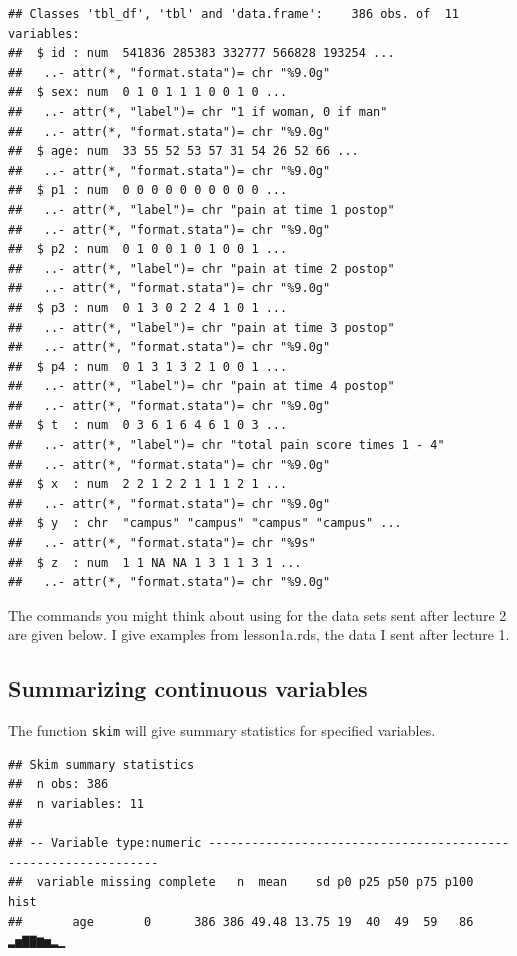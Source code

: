 \documentclass[]{book}
\newenvironment{Shaded}{\begin{snugshade}}{\end{snugshade}}
\newcommand{\KeywordTok}[1]{\textcolor[rgb]{0.13,0.29,0.53}{\textbf{#1}}}
\newcommand{\NormalTok}[1]{#1}
\newcommand{\OperatorTok}[1]{\textcolor[rgb]{0.81,0.36,0.00}{\textbf{#1}}}
\newcommand{\StringTok}[1]{\textcolor[rgb]{0.31,0.60,0.02}{#1}}
\begin{document}
\begin{verbatim}
## Classes 'tbl_df', 'tbl' and 'data.frame':    386 obs. of  11 variables:
##  $ id : num  541836 285383 332777 566828 193254 ...
##   ..- attr(*, "format.stata")= chr "%9.0g"
##  $ sex: num  0 1 0 1 1 1 0 0 1 0 ...
##   ..- attr(*, "label")= chr "1 if woman, 0 if man"
##   ..- attr(*, "format.stata")= chr "%9.0g"
##  $ age: num  33 55 52 53 57 31 54 26 52 66 ...
##   ..- attr(*, "format.stata")= chr "%9.0g"
##  $ p1 : num  0 0 0 0 0 0 0 0 0 0 ...
##   ..- attr(*, "label")= chr "pain at time 1 postop"
##   ..- attr(*, "format.stata")= chr "%9.0g"
##  $ p2 : num  0 1 0 0 1 0 1 0 0 1 ...
##   ..- attr(*, "label")= chr "pain at time 2 postop"
##   ..- attr(*, "format.stata")= chr "%9.0g"
##  $ p3 : num  0 1 3 0 2 2 4 1 0 1 ...
##   ..- attr(*, "label")= chr "pain at time 3 postop"
##   ..- attr(*, "format.stata")= chr "%9.0g"
##  $ p4 : num  0 1 3 1 3 2 1 0 0 1 ...
##   ..- attr(*, "label")= chr "pain at time 4 postop"
##   ..- attr(*, "format.stata")= chr "%9.0g"
##  $ t  : num  0 3 6 1 6 4 6 1 0 3 ...
##   ..- attr(*, "label")= chr "total pain score times 1 - 4"
##   ..- attr(*, "format.stata")= chr "%9.0g"
##  $ x  : num  2 2 1 2 2 1 1 1 2 1 ...
##   ..- attr(*, "format.stata")= chr "%9.0g"
##  $ y  : chr  "campus" "campus" "campus" "campus" ...
##   ..- attr(*, "format.stata")= chr "%9s"
##  $ z  : num  1 1 NA NA 1 3 1 1 3 1 ...
##   ..- attr(*, "format.stata")= chr "%9.0g"
\end{verbatim}

The commands you might think about using for the data sets sent after
lecture 2 are given below. I give examples from lesson1a.rds, the data I
sent after lecture 1.

\hypertarget{summarizing-continuous-variables}{%
\subsection{Summarizing continuous
variables}\label{summarizing-continuous-variables}}

The function \texttt{skim} will give summary statistics for specified
variables.

\begin{Shaded}
\end{Shaded}

\begin{verbatim}
## Skim summary statistics
##  n obs: 386 
##  n variables: 11 
## 
## -- Variable type:numeric ---------------------------------------------------------------
##  variable missing complete   n  mean    sd p0 p25 p50 p75 p100     hist
##       age       0      386 386 49.48 13.75 19  40  49  59   86 ▂▅▇▇▆▅▂▁
\end{verbatim}
\end{document}
